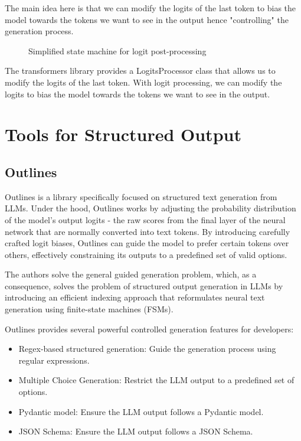 \documentclass{article}
\begin{document}
The main idea here is that we can modify the logits of the last token to bias the model towards the tokens we want to see in the output hence "controlling" the generation process.

\begin{figure}
    \centering
    \caption{Simplified state machine for logit post-processing}
    \label{fig:state-machine}
\end{figure}

The transformers library provides a LogitsProcessor class that allows us to modify the logits of the last token. With logit processing, we can modify the logits to bias the model towards the tokens we want to see in the output.

\section{Tools for Structured Output}

\subsection{Outlines}

Outlines is a library specifically focused on structured text generation from LLMs. Under the hood, Outlines works by adjusting the probability distribution of the model's output logits - the raw scores from the final layer of the neural network that are normally converted into text tokens. By introducing carefully crafted logit biases, Outlines can guide the model to prefer certain tokens over others, effectively constraining its outputs to a predefined set of valid options.

The authors solve the general guided generation problem, which, as a consequence, solves the problem of structured output generation in LLMs by introducing an efficient indexing approach that reformulates neural text generation using finite-state machines (FSMs).

Outlines provides several powerful controlled generation features for developers:
\begin{itemize}
    \item Regex-based structured generation: Guide the generation process using regular expressions.
    \item Multiple Choice Generation: Restrict the LLM output to a predefined set of options.
    \item Pydantic model: Ensure the LLM output follows a Pydantic model.
    \item JSON Schema: Ensure the LLM output follows a JSON Schema.
\end{itemize}
\end{document}
